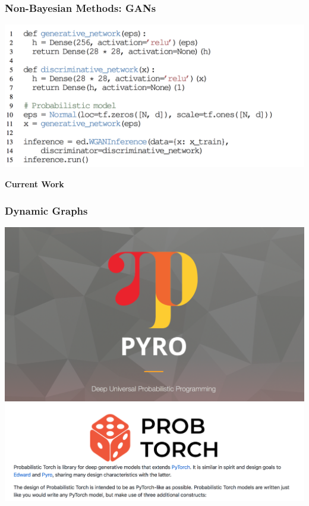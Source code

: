 \documentclass[10pt,
               xcolor={usenames,dvipsnames},
               hyperref={colorlinks,linktoc=all,citecolor=Plum,linkcolor=MidnightBlue,urlcolor=MidnightBlue},noamssymb]{beamer}
\begin{document}
\begin{frame}
\frametitle{Non-Bayesian Methods: GANs}
\begin{center}
\vspace{-2ex}
\includegraphics[width=1.1\textwidth]{img/ganw_example.png}
\end{center}
\end{frame}

\begin{frame}
\begin{center}
{\Large\bf Current Work}
\end{center}
\end{frame}

\begin{frame}[t]
\frametitle{Dynamic Graphs}
\begin{center}
\vspace{-1.25ex}
\includegraphics[width=1.0\textwidth]{img/pyro.png}
\\[-8.75ex]
\includegraphics[width=1.0\textwidth]{img/probtorch.png}
\end{center}
\end{frame}
\end{document}
